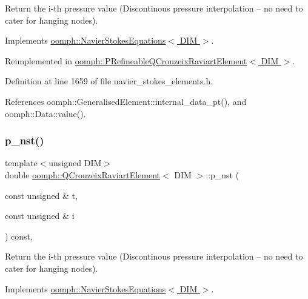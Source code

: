 Return the i-\/th pressure value (Discontinous pressure interpolation -- no need to cater for hanging nodes). 



Implements \hyperlink{classoomph_1_1NavierStokesEquations_ae00a22f99df3630b3ab751a4453a7fd8}{oomph\+::\+Navier\+Stokes\+Equations$<$ D\+I\+M $>$}.



Reimplemented in \hyperlink{classoomph_1_1PRefineableQCrouzeixRaviartElement_a2a9613cf21e1d115893491423ca5394a}{oomph\+::\+P\+Refineable\+Q\+Crouzeix\+Raviart\+Element$<$ D\+I\+M $>$}.



Definition at line 1659 of file navier\+\_\+stokes\+\_\+elements.\+h.



References oomph\+::\+Generalised\+Element\+::internal\+\_\+data\+\_\+pt(), and oomph\+::\+Data\+::value().

\mbox{\label{classoomph_1_1QCrouzeixRaviartElement_ab7e5c4345c95002750592f7dcaa7a1c5}} 
\subsubsection{\texorpdfstring{p\+\_\+nst()}{p\_nst()}\hspace{0.1cm}{\footnotesize\ttfamily [2/2]}}
{\footnotesize\ttfamily template$<$unsigned D\+IM$>$ \\
double \hyperlink{classoomph_1_1QCrouzeixRaviartElement}{oomph\+::\+Q\+Crouzeix\+Raviart\+Element}$<$ D\+IM $>$\+::p\+\_\+nst (\begin{DoxyParamCaption}\item[{const unsigned \&}]{t,  }\item[{const unsigned \&}]{i }\end{DoxyParamCaption}) const\hspace{0.3cm}{\ttfamily [inline]}, {\ttfamily [virtual]}}



Return the i-\/th pressure value (Discontinous pressure interpolation -- no need to cater for hanging nodes). 



Implements \hyperlink{classoomph_1_1NavierStokesEquations_a0a39f638a61fd9a6c999c16e94deb31b}{oomph\+::\+Navier\+Stokes\+Equations$<$ D\+I\+M $>$}.



